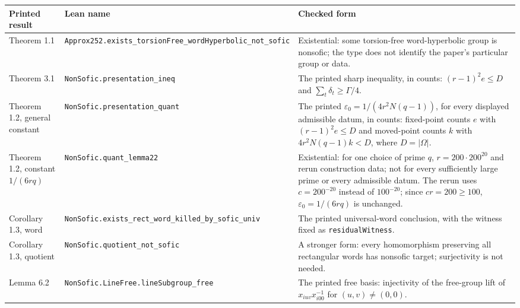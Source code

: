 \documentclass[11pt]{article}
\theoremstyle{definition}
\theoremstyle{remark}
\numberwithin{equation}{section}
\newcommand{\eps}{\varepsilon}
\newcommand{\lean}[1]{\nolinkurl{#1}}
\begin{document}
\begin{center}\footnotesize
\begin{minipage}{\linewidth}
\setlength{\tabcolsep}{4pt}
\begin{tabular}{@{}>{\raggedright\arraybackslash}p{.16\linewidth}>{\raggedright\arraybackslash}p{.30\linewidth}>{\raggedright\arraybackslash}p{.48\linewidth}@{}}
\toprule Printed result & Lean name & Checked form\\\midrule
Theorem 1.1 & \lean{Approx252.exists_torsionFree_wordHyperbolic_not_sofic} & Existential: some torsion-free word-hyperbolic group is nonsofic; the type does not identify the paper's particular group or data.\\[4pt]
Theorem 3.1 & \lean{NonSofic.presentation_ineq} & The printed sharp inequality, in counts: $(r-1)^2e\le D$ and $\sum_t\delta_t\ge\Gamma/4$.\\[4pt]
Theorem 1.2, general constant & \lean{NonSofic.presentation_quant} & The printed $\eps_0=1/(4r^2N(q-1))$, for every displayed admissible datum, in counts: fixed-point counts $e$ with $(r-1)^2e\le D$ and moved-point counts $k$ with $4r^2N(q-1)k<D$, where $D=|\Omega|$.\\[4pt]
Theorem 1.2, constant $1/(6rq)$ & \lean{NonSofic.quant_lemma22} & Existential: for one choice of prime $q$, $r=200\cdot200^{20}$ and rerun construction data; not for every sufficiently large prime or every admissible datum. The rerun uses $c=200^{-20}$ instead of $100^{-20}$; since $cr=200\ge100$, $\eps_0=1/(6rq)$ is unchanged.\\[4pt]
Corollary 1.3, word & \lean{NonSofic.exists_rect_word_killed_by_sofic_univ} & The printed universal-word conclusion, with the witness fixed as \lean{residualWitness}.\\[4pt]
Corollary 1.3, quotient & \lean{NonSofic.quotient_not_sofic} & A stronger form: every homomorphism preserving all rectangular words has nonsofic target; surjectivity is not needed.\\[4pt]
Lemma 6.2 & \lean{NonSofic.LineFree.lineSubgroup_free} & The printed free basis: injectivity of the free-group lift of $x_{iuv}x_{i00}^{-1}$ for $(u,v)\ne(0,0)$.\\
\bottomrule
\end{tabular}
\end{minipage}
\end{center}
\end{document}
